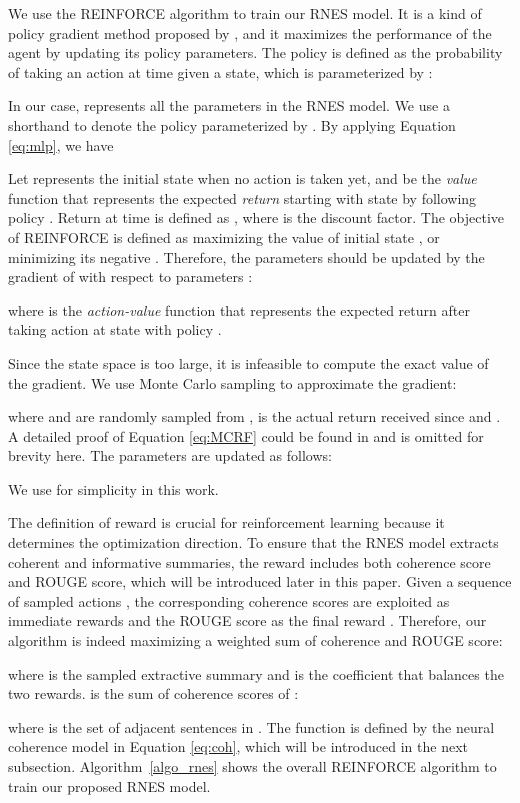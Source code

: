 \documentclass[letterpaper]{article} \usepackage{aaai18}  \usepackage{times}  \usepackage{helvet}  \usepackage{courier}  \usepackage{url}  \usepackage{graphicx}  \usepackage{amssymb}
\begin{document}
	We use the REINFORCE algorithm to train our RNES model. It is a kind of policy gradient method proposed by  \cite{williams_simple_1992}, and it maximizes the performance of the agent by updating its policy parameters. The policy is defined as the probability of taking an action at time  given a state, which is parameterized by :
	
	In our case,  represents all the parameters in the RNES model. We use a shorthand  to denote the policy  parameterized by . By applying Equation \ref{eq:mlp}, we have
	
	
	Let  represents the initial state when no action is taken yet, and  be the \emph{value} function that represents the expected \emph{return} starting with state  by following policy . Return at time  is defined as , where  is the discount factor. The objective of REINFORCE is defined as maximizing the value of initial state , or minimizing its negative . Therefore, the parameters should be updated by the gradient of  with respect to parameters :
	 
	where  is the \emph{action-value} function that represents the expected return after taking action  at state  with policy . 


	Since the state space is too large, it is infeasible to compute the exact value of the gradient. We use Monte Carlo sampling to approximate the gradient:

	where  and  are randomly sampled from ,  is the actual return received since  and . A detailed proof of Equation \ref{eq:MCRF} could be found in \cite{sutton_reinforcement_nodate} and is omitted for brevity here. The parameters  are updated as follows:
	
	We use  for simplicity in this work.
	
	The definition of reward is crucial for reinforcement learning because it determines the optimization direction. To ensure that the RNES model extracts coherent and informative summaries, the reward includes both coherence score and ROUGE score, which will be introduced later in this paper. Given a sequence of sampled actions , the corresponding coherence scores are exploited as immediate rewards  and the ROUGE score as the final reward . Therefore, our algorithm is indeed maximizing a weighted sum of coherence and ROUGE score:
	
	where  is the sampled extractive summary and  is the coefficient that balances the two rewards.  is the sum of coherence scores of :
	
 	where  is the set of adjacent sentences in . The function  is defined by the neural coherence model in Equation \ref{eq:coh}, which will be introduced in the next subsection. Algorithm~\ref{algo_rnes} shows the overall REINFORCE algorithm to train our proposed RNES model.  
	
\end{document}
